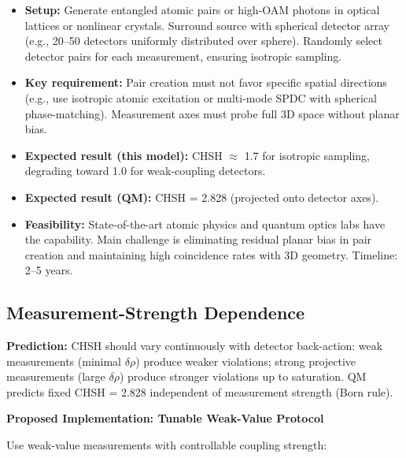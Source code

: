 \documentclass[11pt,a4paper]{article}
\theoremstyle{definition}
\theoremstyle{remark}
\begin{document}
\begin{itemize}
\item \textbf{Setup:} Generate entangled atomic pairs or high-OAM photons in optical lattices or nonlinear crystals. Surround source with spherical detector array (e.g., 20--50 detectors uniformly distributed over sphere). Randomly select detector pairs for each measurement, ensuring isotropic sampling.

\item \textbf{Key requirement:} Pair creation must not favor specific spatial directions (e.g., use isotropic atomic excitation or multi-mode SPDC with spherical phase-matching). Measurement axes must probe full 3D space without planar bias.

\item \textbf{Expected result (this model):} CHSH $\approx$ 1.7 for isotropic sampling, degrading toward 1.0 for weak-coupling detectors.

\item \textbf{Expected result (QM):} CHSH = 2.828 (projected onto detector axes).

\item \textbf{Feasibility:} State-of-the-art atomic physics and quantum optics labs have the capability. Main challenge is eliminating residual planar bias in pair creation and maintaining high coincidence rates with 3D geometry. Timeline: 2--5 years.
\end{itemize}

\subsection{Measurement-Strength Dependence}

\textbf{Prediction:} CHSH should vary continuously with detector back-action: weak measurements (minimal $\delta\rho$) produce weaker violations; strong projective measurements (large $\delta\rho$) produce stronger violations up to saturation. QM predicts fixed CHSH = 2.828 independent of measurement strength (Born rule).

\textbf{Proposed Implementation: Tunable Weak-Value Protocol}

Use weak-value measurements with controllable coupling strength:
\end{document}
